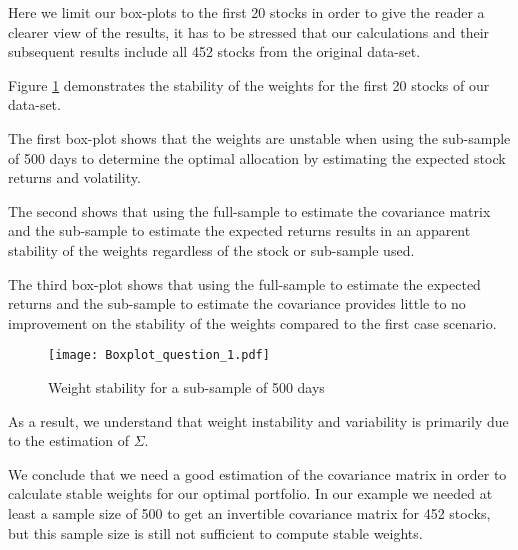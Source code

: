 Here we limit our box-plots to the first 20 stocks in order to give the reader a clearer view of the results, it has to be stressed that our calculations and their subsequent results include all 452 stocks from the original data-set.
\par\smallskip
Figure \ref{fig1} demonstrates the stability of the weights for the first 20 stocks of our data-set.\par
The first box-plot shows that the weights are unstable when using the sub-sample of 500 days to determine the optimal allocation by estimating the expected stock returns and volatility.\par
The second shows that using the full-sample to estimate the covariance matrix and the sub-sample to estimate the expected returns results in an apparent stability of the weights regardless of the stock or sub-sample used.\par
The third box-plot shows that using the full-sample to estimate the expected returns and the sub-sample to estimate the covariance provides little to no improvement on the stability of the weights compared to the first case scenario. 

\begin{figure}[H]
\texttt{[image: Boxplot\_question\_1.pdf]}
\caption{Weight stability for a sub-sample of 500 days}
\label{fig1}
\end{figure}

As a result, we understand that weight instability and variability is primarily due to the estimation of $\Sigma$.
\par\smallskip
We conclude that we need a good estimation of the covariance matrix in order to calculate stable weights for our optimal portfolio. In our example we needed at least a sample size of 500 to get an invertible covariance matrix for 452 stocks, but this sample size is still not sufficient to compute stable weights.  
 
